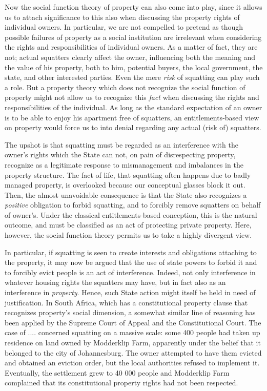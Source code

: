 Now the social function theory of property can also come into play, since it allows us to attach significance to this also when discussing the property rights of individual owners.  In particular, we are not compelled to pretend as though possible failures of property as a social institution are irrelevant when considering the rights and responsibilities of individual owners. As a matter of fact, they are not; actual squatters clearly affect the owner, influencing both the meaning and the value of his property, both to him, potential buyers, the local government, the state, and other interested parties. Even the mere {\it risk} of squatting can play such a role. But a property theory which does not recognize the social function of property might not allow us to recognize this {\it fact} when discussing the rights and responsibilities of the individual. As long as the standard expectation of an owner is to be able to enjoy his apartment free of squatters, an entitlements-based view on property would force us to into denial regarding any actual (risk of) squatters.

The upshot is that squatting must be regarded as an interference with the owner's rights which the State can not, on pain of disrespecting property, recognize as a legitimate response to mismanagement and imbalances in the property structure. The fact of life, that squatting often happens due to badly managed property, is overlooked because our conceptual glasses block it out. Then, the almost unavoidable consequence is that the State also recognizes a {\it positive} obligation to forbid squatting, and to forcibly remove squatters on behalf of owner's. Under the classical entitlements-based conception, this is the natural outcome, and must be classified as an act of protecting private property. Here, however, the social function theory permits us to take a highly divergent view. 

In particular, if squatting is seen to create interests and obligations attaching to the property, it may now be argued that the use of state powers to forbid it and to forcibly evict people is an act of interference. Indeed, not only interference in whatever housing rights the squatters may have, but in fact also as an interference in {\it property}. Hence, such State action might itself be held in need of justification. In South Africa, which has a constitutional property clause that recognizes property's social dimension, a somewhat similar line of reasoning has been applied by the Supreme Court of Appeal and the Constitutional Court. The case of .... concerned squatting on a massive scale: some 400 people had taken up residence on land owned by Modderklip Farm, apparently under the belief that it belonged to the city of Johannesburg. The owner attempted to have them evicted and obtained an eviction 
order, but the local authorities refused to implement it. Eventually, the settlement grew to 40 000 people and Modderklip Farm complained that its constitutional property rights had not been respected.

